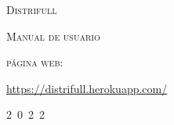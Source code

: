 \thispagestyle{empty}
\vspace*{0.5cm}
\begin{center}
	{\Large\scshape Distrifull\\[5pt] }
\end{center}


\vspace*{1cm}
\begin{center}
\end{center}

\vspace*{1cm}
\begin{center}
	{\Large\scshape Manual de usuario}
\end{center}

\vspace*{2cm}
\begin{center}
	{\large\scshape p\'agina web: \\ [3.pt]  }
\end{center}

\vspace*{2cm}
\begin{center}
	{\rm \url{https://distrifull.herokuapp.com/} }
\end{center}

\hfill
\begin{center}
	2\ 0\ 2\ 2
\end{center}
